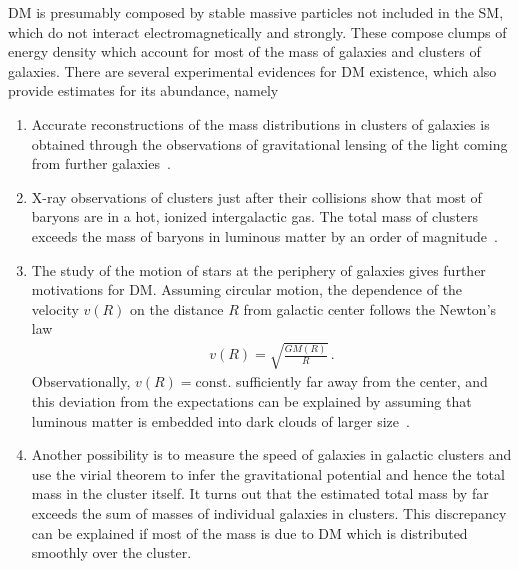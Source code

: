 \documentclass[12pt,a4paper]{book}
\newcommand{\ben}{\begin{enumerate}}
\newcommand{\een}{\end{enumerate}}
\begin{document}
DM is presumably composed by stable massive particles not included in the SM, which do not interact electromagnetically and strongly. These compose clumps of energy density which account for most of the mass of galaxies and clusters of galaxies. There are several experimental evidences for DM existence, which also provide estimates for its abundance, namely
\ben
\item Accurate reconstructions of the mass distributions in clusters of galaxies is obtained through the observations of gravitational lensing of the light coming from further galaxies~\cite{Lesgourgues:2007te, Massey:2007gh}.
\item X-ray observations of clusters just after their collisions show that most of baryons are in a hot, ionized intergalactic gas. The total mass of clusters exceeds the mass of baryons in luminous matter by an order of magnitude~\cite{Vikhlinin:2005mp}.
\item The study of the motion of stars at the periphery of galaxies gives further motivations for DM. Assuming circular motion, the dependence of the velocity $v(R)$ on the distance $R$ from galactic center follows the Newton's law
\begin{align}
\label{eq:NewtonLaw}
v(R) = \sqrt{\frac{G M(R)}{R}}\,.
\end{align}
Observationally, $v(R) = \text{const.}$ sufficiently far away from the center, and this deviation from the expectations can be explained by assuming that luminous matter is embedded into dark clouds of larger size~\cite{Begeman:1991iy}.
\item Another possibility is to measure the speed of galaxies in galactic clusters and use the virial theorem to infer the gravitational potential and hence the total mass in the cluster itself. It turns out that the estimated total mass by far exceeds the sum of masses of individual galaxies in clusters. This discrepancy can be explained if most of the mass is due to DM which is distributed smoothly over the cluster.
\een
\end{document}
